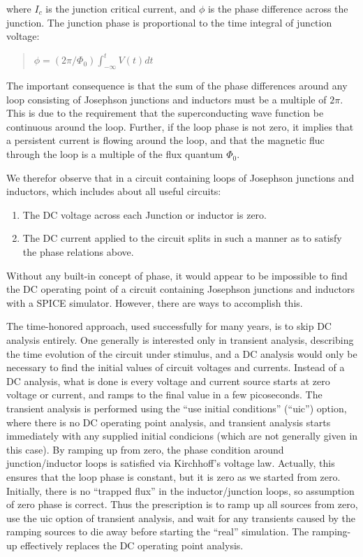 where $I_c$ is the junction critical current, and $\phi$ is the phase
difference across the junction.  The junction phase is proportional to
the time integral of junction voltage:

\begin{quote}
$\phi = (2\pi/\Phi_0)\int^t_{-\infty} V(t)dt$
\end{quote}

The important consequence is that the sum of the phase differences
around any loop consisting of Josephson junctions and inductors must
be a multiple of $2\pi$.  This is due to the requirement that the
superconducting wave function be continuous around the loop.  Further,
if the loop phase is not zero, it implies that a persistent current is
flowing around the loop, and that the magnetic fluc through the loop
is a multiple of the flux quantum $\Phi_0$.

We therefor observe that in a circuit containing loops of Josephson
junctions and inductors, which includes about all useful circuits:

\begin{enumerate}
\item{The DC voltage across each Junction or inductor is zero.}
\item{The DC current applied to the circuit splits in such a manner
as to satisfy the phase relations above.}
\end{enumerate}

Without any built-in concept of phase, it would appear to be
impossible to find the DC operating point of a circuit containing
Josephson junctions and inductors with a SPICE simulator.  However,
there are ways to accomplish this.

The time-honored approach, used successfully for many years, is to
skip DC analysis entirely.  One generally is interested only in
transient analysis, describing the time evolution of the circuit under
stimulus, and a DC analysis would only be necessary to find the
initial values of circuit voltages and currents.  Instead of a DC
analysis, what is done is every voltage and current source starts at
zero voltage or current, and ramps to the final value in a few
picoseconds.  The transient analysis is performed using the ``use
initial conditions'' (``{\vt uic}'') option, where there is no DC
operating point analysis, and transient analysis starts immediately
with any supplied initial condicions (which are not generally given in
this case).  By ramping up from zero, the phase condition around
junction/inductor loops is satisfied via Kirchhoff's voltage law. 
Actually, this ensures that the loop phase is constant, but it is zero
as we started from zero.  Initially, there is no ``trapped flux'' in
the inductor/junction loops, so assumption of zero phase is correct. 
Thus the prescription is to ramp up all sources from zero, use the
{\vt uic} option of transient analysis, and wait for any transients
caused by the ramping sources to die away before starting the ``real''
simulation.  The ramping-up effectively replaces the DC operating
point analysis.


